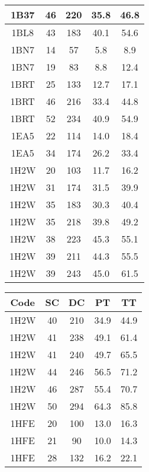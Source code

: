 \begin{table}[htbp]
\begin{tabular}{||c | c c c c||}
        \hline
        1B37 & 46 & 220 & 35.8 & 46.8 \\
        \hline
        1BL8 & 43 & 183 & 40.1 & 54.6 \\
        \hline
        1BN7 & 14 & 57 & 5.8 & 8.9 \\
        \hline
        1BN7 & 19 & 83 & 8.8 & 12.4 \\
        \hline
        1BRT & 25 & 133 & 12.7 & 17.1 \\
        \hline
        1BRT & 46 & 216 & 33.4 & 44.8 \\
        \hline
        1BRT & 52 & 234 & 40.9 & 54.9 \\
        \hline
        1EA5 & 22 & 114 & 14.0 & 18.4 \\
        \hline
        1EA5 & 34 & 174 & 26.2 & 33.4 \\
        \hline
        1H2W & 20 & 103 & 11.7 & 16.2 \\
        \hline
        1H2W & 31 & 174 & 31.5 & 39.9 \\
        \hline
        1H2W & 35 & 183 & 30.3 & 40.4 \\
        \hline
        1H2W & 35 & 218 & 39.8 & 49.2 \\
        \hline
        1H2W & 38 & 223 & 45.3 & 55.1 \\
        \hline
        1H2W & 39 & 211 & 44.3 & 55.5 \\
        \hline
        1H2W & 39 & 243 & 45.0 & 61.5 \\
        \hline
    \end{tabular}
    \hfill
    \begin{tabular}{||c | c c c c||}
        \hline
        Code & SC & DC & PT & TT \\ [0.5ex]
        \hline\hline
        1H2W & 40 & 210 & 34.9 & 44.9 \\
        \hline
        1H2W & 41 & 238 & 49.1 & 61.4 \\
        \hline
        1H2W & 41 & 240 & 49.7 & 65.5 \\
        \hline
        1H2W & 44 & 246 & 56.5 & 71.2 \\
        \hline
        1H2W & 46 & 287 & 55.4 & 70.7 \\
        \hline
        1H2W & 50 & 294 & 64.3 & 85.8 \\
        \hline
        1HFE & 20 & 100 & 13.0 & 16.3 \\
        \hline
        1HFE & 21 & 90 & 10.0 & 14.3 \\
        \hline
        1HFE & 28 & 132 & 16.2 & 22.1 \\

\end{tabular}
\end{table}
